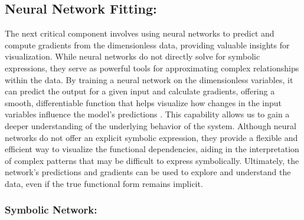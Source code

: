\documentclass{article}
\begin{document}
\subsection{Neural Network Fitting: }


The next critical component involves using neural networks to predict and compute gradients from the dimensionless data, providing valuable insights for visualization. While neural networks do not directly solve for symbolic expressions, they serve as powerful tools for approximating complex relationships within the data. By training a neural network on the dimensionless variables, it can predict the output for a given input and calculate gradients, offering a smooth, differentiable function that helps visualize how changes in the input variables influence the model’s predictions \cite{Alnuqaydan2023}. This capability allows us to gain a deeper understanding of the underlying behavior of the system. Although neural networks do not offer an explicit symbolic expression, they provide a flexible and efficient way to visualize the functional dependencies, aiding in the interpretation of complex patterns that may be difficult to express symbolically. Ultimately, the network's predictions and gradients can be used to explore and understand the data, even if the true functional form remains implicit.\\







\subsubsection{Symbolic Network:}
\end{document}
